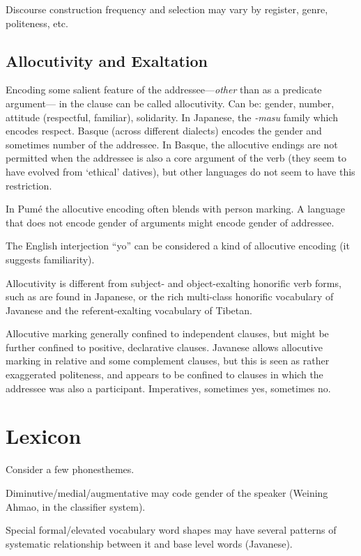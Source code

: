 \documentclass[11pt]{article}
\begin{document}
Discourse construction frequency and selection may vary by register,
genre, politeness, etc. 

\subsection{Allocutivity and Exaltation} Encoding some salient feature
of the addressee---\textit{other} than as a predicate argument--- in
the clause can be called allocutivity.  Can be: gender, number,
attitude (respectful, familiar), solidarity.  In Japanese, the
\textit{-masu} family which encodes respect.  Basque (across different
dialects) encodes the gender and sometimes number of the addressee.
In Basque, the allocutive endings are not permitted when the addressee
is also a core argument of the verb (they seem to have evolved from
`ethical' datives), but other languages do not seem to have this
restriction.

In Pumé the allocutive encoding often blends with person marking.  A
language that does not encode gender of arguments might encode gender
of addressee.

The English interjection ``yo'' can be considered a kind of allocutive
encoding (it suggests familiarity).

Allocutivity is different from subject- and object-exalting honorific
verb forms, such as are found in Japanese, or the rich multi-class
honorific vocabulary of Javanese and the referent-exalting vocabulary
of Tibetan.

Allocutive marking generally confined to independent clauses, but
might be further confined to positive, declarative clauses.  Javanese
allows allocutive marking in relative and some complement clauses, but
this is seen as rather exaggerated politeness, and appears to be
confined to clauses in which the addressee was also a participant.
Imperatives, sometimes yes, sometimes no.



\section{Lexicon}
Consider a few phonesthemes.

Diminutive/medial/augmentative may code gender of the speaker (Weining
Ahmao, in the classifier system).

Special formal/elevated vocabulary word shapes may have several
patterns of systematic relationship between it and base level words
(Javanese).
\end{document}
